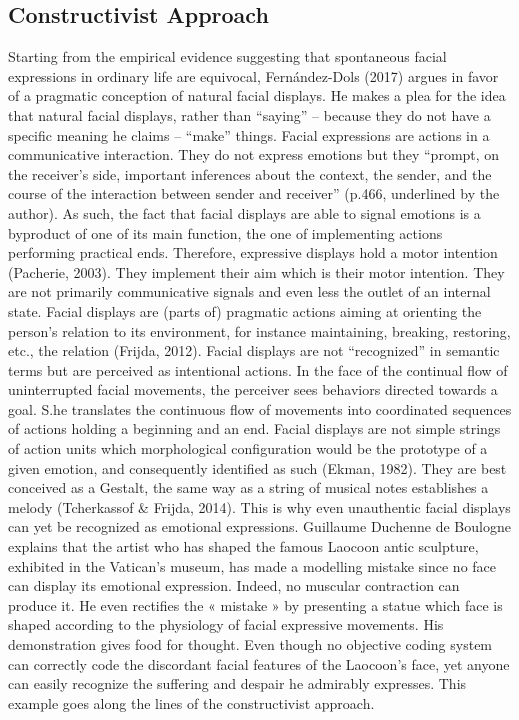 \documentclass[man]{apa6}
\begin{document}
\hypertarget{constructivist-approach}{%
\subsection{Constructivist Approach}\label{constructivist-approach}}

Starting from the empirical evidence suggesting that spontaneous facial expressions in ordinary life are equivocal, Fernández-Dols (2017) argues in favor of a pragmatic conception of natural facial displays. He makes a plea for the idea that natural facial displays, rather than \enquote{saying} -- because they do not have a specific meaning he claims -- \enquote{make} things. Facial expressions are actions in a communicative interaction. They do not express emotions but they \enquote{prompt, on the receiver's side, important inferences about the context, the sender, and the course of the interaction between sender and receiver} (p.466, underlined by the author). As such, the fact that facial displays are able to signal emotions is a byproduct of one of its main function, the one of implementing actions performing practical ends. Therefore, expressive displays hold a motor intention (Pacherie, 2003). They implement their aim which is their motor intention. They are not primarily communicative signals and even less the outlet of an internal state. Facial displays are (parts of) pragmatic actions aiming at orienting the person's relation to its environment, for instance maintaining, breaking, restoring, etc., the relation (Frijda, 2012). Facial displays are not \enquote{recognized} in semantic terms but are perceived as intentional actions. In the face of the continual flow of uninterrupted facial movements, the perceiver sees behaviors directed towards a goal. S.he translates the continuous flow of movements into coordinated sequences of actions holding a beginning and an end. Facial displays are not simple strings of action units which morphological configuration would be the prototype of a given emotion, and consequently identified as such (Ekman, 1982). They are best conceived as a Gestalt, the same way as a string of musical notes establishes a melody (Tcherkassof \& Frijda, 2014). This is why even unauthentic facial displays can yet be recognized as emotional expressions. Guillaume Duchenne de Boulogne explains that the artist who has shaped the famous Laocoon antic sculpture, exhibited in the Vatican's museum, has made a modelling mistake since no face can display its emotional expression. Indeed, no muscular contraction can produce it. He even rectifies the « mistake » by presenting a statue which face is shaped according to the physiology of facial expressive movements. His demonstration gives food for thought. Even though no objective coding system can correctly code the discordant facial features of the Laocoon's face, yet anyone can easily recognize the suffering and despair he admirably expresses. This example goes along the lines of the constructivist approach.
\end{document}
